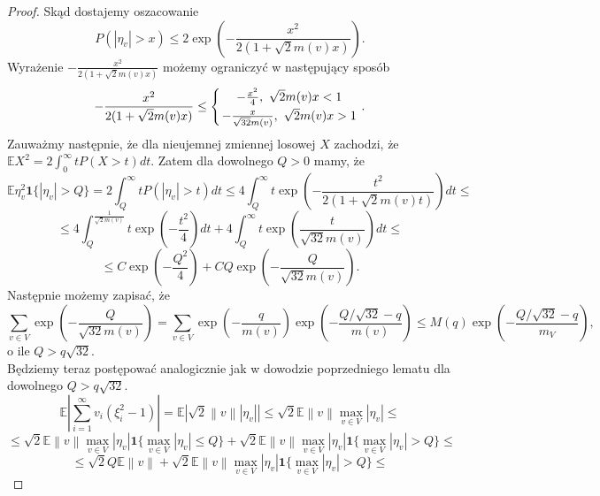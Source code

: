 \documentclass{article}
\newcommand{\norm}[1]{\left\lVert#1\right\rVert}
\begin{document}
\begin{proof}
Skąd dostajemy oszacowanie 
\begin{displaymath}
P(|\eta_v|>x)\leq 2\exp\left(-\frac{x^2}{2(1+\sqrt{2}m(v)x)}\right).
\end{displaymath}
Wyrażenie $-\frac{x^2}{2(1+\sqrt{2}m(v)x)}$ możemy ograniczyć w następujący sposób
\begin{displaymath}
-\frac{x^2}{2(1+\sqrt{2}m(v)x)}\leq \left\{{-\frac{x^2}{4},\ \sqrt{2}m(v)x<1}\atop{-\frac{x}{\sqrt{32}m(v)},\ \sqrt{2}m(v)x>1}\right. .
\end{displaymath}
Zauważmy następnie, że dla nieujemnej zmiennej losowej $X$ zachodzi, że $\mathbb{E}X^2=2\int_0^{\infty}tP(X>t)dt$. Zatem dla dowolnego $Q>0$ mamy, że
\begin{displaymath}
\mathbb{E}\eta_v^2\pmb{1}\{|\eta_v|>Q\}=2\int_Q^{\infty}tP(|\eta_v|>t)dt\leq 4\int_Q^{\infty}t\exp\left(-\frac{t^2}{2(1+\sqrt{2}m(v)t)}\right)dt\leq
\end{displaymath}
\begin{displaymath}
\leq 4\int_Q^{\frac{1}{\sqrt{2}m(v)}}t\exp\left(-\frac{t^2}{4}\right)dt+4\int_Q^{\infty}t\exp \left(\frac{t}{\sqrt{32}m(v)}\right)dt\leq
\end{displaymath}
\begin{displaymath}
\leq C\exp\left(-\frac{Q^2}{4}\right)+CQ\exp\left(-\frac{Q}{\sqrt{32}m(v)}\right).
\end{displaymath}
Następnie możemy zapisać, że
\begin{displaymath}
\sum_{v\in V}\exp\left(-\frac{Q}{\sqrt{32}m(v)}\right)=\sum_{v\in V}\exp\left(-\frac{q}{m(v)}\right)\exp \left(-\frac{Q/\sqrt{32}-q}{m(v)}\right)\leq M(q)\exp \left(-\frac{Q/\sqrt{32}-q}{m_V}\right),
\end{displaymath}
o ile $Q>q\sqrt{32}$.\\
Będziemy teraz postępować analogicznie jak w dowodzie poprzedniego lematu dla dowolnego $Q>q\sqrt{32}$.
\begin{displaymath}
\mathbb{E}\left|\sum_{i=1}^{\infty}v_i(\xi_i^2-1)\right|=\mathbb{E}\left|\sqrt{2}\norm{v}|\eta_v|\right|\leq \sqrt{2}\mathbb{E}\norm{v}\max_{v\in V}|\eta_v|\leq
\end{displaymath}
\begin{displaymath}
\leq \sqrt{2}\mathbb{E}\norm{v}\max_{v\in V}|\eta_v|\pmb{1}\{\max_{v\in V}|\eta_v|\leq Q\}+\sqrt{2}\mathbb{E}\norm{v}\max_{v\in V}|\eta_v|\pmb{1}\{\max_{v\in V}|\eta_v|> Q\}\leq
\end{displaymath}
\begin{displaymath}
\leq \sqrt{2}Q\mathbb{E}\norm{v}+\sqrt{2}\mathbb{E}\norm{v}\max_{v\in V}|\eta_v|\pmb{1}\{\max_{v\in V}|\eta_v|> Q\}\leq

\end{displaymath}
\end{proof}
\end{document}
